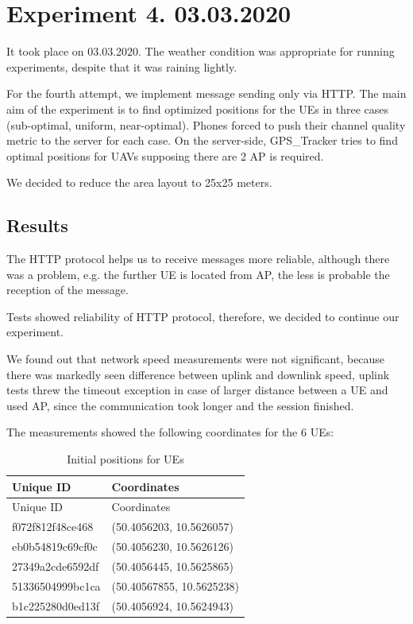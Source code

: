 \section{Experiment 4. 03.03.2020}\label{experiment-4.-03.03.2020}

It took place on 03.03.2020. The weather condition was appropriate for running experiments, despite that it was raining lightly.

For the fourth attempt, we implement message sending only via HTTP. The main aim of the experiment is to find optimized positions for the UEs in three cases (sub-optimal, uniform, near-optimal). Phones forced to push their channel quality metric to the server for each case. On the server-side, GPS\_Tracker tries to find optimal positions for UAVs supposing there are 2 AP is required.

We decided to reduce the area layout to 25x25 meters.

\subsection{Results}

The HTTP protocol helps us to receive messages more reliable, although there was a problem, e.g. the further UE is located from AP, the less is probable the reception of the message.

Tests showed reliability of HTTP protocol, therefore, we decided to continue our experiment.

We found out that network speed measurements were not significant, because there was markedly seen difference between uplink and downlink speed, uplink tests threw the timeout exception in case of larger distance between a UE and used AP, since the communication took longer and the session finished.

The measurements showed the following coordinates for the 6 UEs:

\begin{longtable}[]{@{}ll@{}}
\caption{Initial positions for UEs}\tabularnewline
\toprule
Unique ID & Coordinates\tabularnewline
\midrule
\endfirsthead
\toprule
Unique ID & Coordinates\tabularnewline
\midrule
\endhead
f072f812f48ce468 & (50.4056203, 10.5626057)\tabularnewline
eb0b54819c69cf0c & (50.4056230, 10.5626126)\tabularnewline
27349a2cde6592df & (50.4056445, 10.5625865)\tabularnewline
51336504999bc1ca & (50.40567855, 10.5625238)\tabularnewline
b1c225280d0ed13f & (50.4056924, 10.5624943)\tabularnewline
\bottomrule
\end{longtable}

